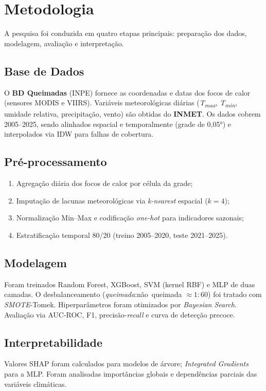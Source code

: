 
\chapter{Metodologia}

A pesquisa foi conduzida em quatro etapas principais: preparação dos dados, modelagem, avaliação e interpretação.

\section{Base de Dados}
O \textbf{BD Queimadas} (INPE) fornece as coordenadas e datas dos focos de calor (sensores MODIS e VIIRS). Variáveis meteorológicas diárias (\textit{T\textsubscript{max}}, \textit{T\textsubscript{min}}, umidade relativa, precipitação, vento) são obtidas do \textbf{INMET}. Os dados cobrem 2005–2025, sendo alinhados espacial e temporalmente (grade de 0,05°) e interpolados via IDW para falhas de cobertura.

\section{Pré-processamento}
\begin{enumerate}
    \item Agregação diária dos focos de calor por célula da grade;
    \item Imputação de lacunas meteorológicas via \textit{k-nearest} espacial ($k=4$);
    \item Normalização Min–Max e codificação \textit{one-hot} para indicadores sazonais;
    \item Estratificação temporal 80/20 (treino 2005–2020, teste 2021–2025).
\end{enumerate}

\section{Modelagem}
Foram treinados Random Forest, XGBoost, SVM (kernel RBF) e MLP de duas camadas. O desbalanceamento (\textit{queimada}:{não~queimada} $\approx 1{:}60$) foi tratado com \textit{SMOTE}-Tomek. Hiperparâmetros foram otimizados por \textit{Bayesian Search}. Avaliação via AUC-ROC, F1, precisão-\textit{recall} e curva de detecção precoce.

\section{Interpretabilidade}
Valores SHAP foram calculados para modelos de árvore; \textit{Integrated Gradients} para a MLP. Foram analisadas importâncias globais e dependências parciais das variáveis climáticas.
